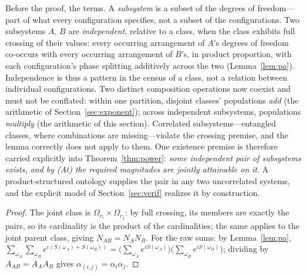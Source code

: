 \documentclass[11pt]{article}
\theoremstyle{definition}
\theoremstyle{remark}
\begin{document}
Before the proof, the terms. A \emph{subsystem} is a subset of the degrees of freedom---part of what every configuration specifies, not a subset of the configurations. Two subsystems $A$, $B$ are \emph{independent}, relative to a class, when the class exhibits full crossing of their values: every occurring arrangement of $A$'s degrees of freedom co-occurs with every occurring arrangement of $B$'s, in product proportion, with each configuration's phase splitting additively across the two (Lemma~\ref{lem:pa}). Independence is thus a pattern in the census of a class, not a relation between individual configurations. Two distinct composition operations now coexist and must not be conflated: within one partition, disjoint classes' populations \emph{add} (the arithmetic of Section~\ref{sec:exponent}); across independent subsystems, populations \emph{multiply} (the arithmetic of this section). Correlated subsystems---entangled classes, where combinations are missing---violate the crossing premise, and the lemma correctly does not apply to them. One existence premise is therefore carried explicitly into Theorem~\ref{thm:power}: \emph{some independent pair of subsystems exists, and by (At) the required magnitudes are jointly attainable on it}. A product-structured ontology supplies the pair in any two uncorrelated systems, and the explicit model of Section~\ref{sec:verif} realizes it by construction.

\begin{proof}
The joint class is $\Omega_{r_i} \times \Omega_{r_j}$: by full crossing, its members are exactly the pairs, so its cardinality is the product of the cardinalities; the same applies to the joint parent class, giving $N_{AB} = N_A N_B$. For the raw sums: by Lemma~\ref{lem:pa}, $\sum_{\omega_A}\sum_{\omega_B} e^{i(S(\omega_A)+S(\omega_B))} = \big(\sum_{\omega_A} e^{iS(\omega_A)}\big)\big(\sum_{\omega_B} e^{iS(\omega_B)}\big)$; dividing by $A_{AB} = A_A A_B$ gives $\alpha_{(i,j)} = \alpha_i \alpha_j$.
\end{proof}
\end{document}
